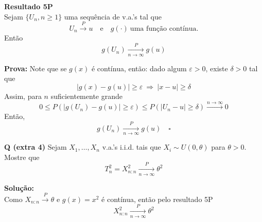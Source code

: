 \textbf{Resultado 5P} \\
Sejam $\{U_n, n \geq 1\}$ uma sequência de v.a.'s tal que
\begin{equation}
    U_n \xrightarrow{P} u \quad \text{e} \quad g(\cdot) \ \text{uma função contínua}.
\end{equation}
Então
\begin{equation}
    g(U_n) \xrightarrow[n \to \infty]{P} g(u)
\end{equation}

\textbf{Prova:} Note que se $g(x)$ é contínua, então: dado algum $\varepsilon > 0$, existe $\delta > 0$ tal que
\begin{equation}
    |g(x) - g(u)| \geq \varepsilon \ \Rightarrow \ |x - u| \geq \delta
\end{equation}
Assim, para $n$ suficientemente grande
\begin{equation}
    0 \leq P\left( |g(U_n) - g(u)| \geq \varepsilon \right) \leq P\left( |U_n - u| \geq \delta \right) \xrightarrow{n \to \infty} 0
\end{equation}
Então,
\begin{equation}
    g(U_n) \xrightarrow[n \to \infty]{P} g(u) \quad \square
\end{equation}

\textbf{Q (extra 4)} Sejam $X_1, \ldots, X_n$ v.a.'s i.i.d. tais que $X_i \sim U(0, \theta)$ para $\theta > 0$. \\
Mostre que
\begin{equation}
    T_n^2 = X_{n:n}^2 \xrightarrow[n \to \infty]{P} \theta^2
\end{equation}

\textbf{Solução:} \\
Como $X_{n:n} \xrightarrow{P} \theta$ e $g(x) = x^2$ é contínua, então pelo resultado 5P
\begin{equation}
    X_{n:n}^2 \xrightarrow[n \to \infty]{P} \theta^2
\end{equation}